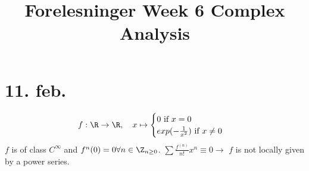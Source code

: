 \title{Forelesninger Week 6 Complex Analysis}
\maketitle
\section{11. feb.}
$$f: \R \to \R, \quad x \mapsto
\begin{cases}
  0 \text{ if } x= 0 \\
  exp(-\frac{1}{x^2}) \text{ if }x \neq 0
\end{cases}
$$
$f$ is of class $C^{\infty}$ and $f^n(0)=0 \forall n \in \Z_{n\geq 0}$.
\newline $\sum \frac{f^{(n)}}{n!}x^n \equiv 0 \rightarrow $ $f$ is not locally given by a power series.

